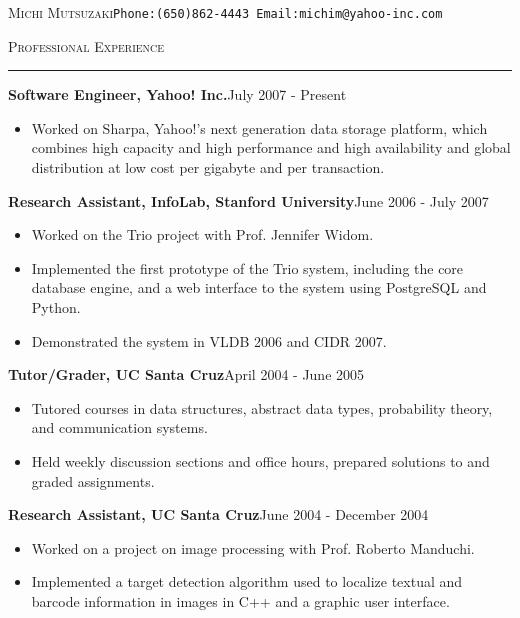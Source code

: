 \documentclass[10pt]{article}
\newcommand{\name}[1]{\begin{center}\Large{\textsc{#1}}\end{center}}
\newcommand{\HRule}{\noindent\rule{\linewidth}{0.1mm}}
\newcommand{\header}[1]{\vspace{0.4cm}\noindent\textsc{\large{#1}}\vspace{-0.2cm}\newline\HRule}
\newcommand{\subheader}[2]{\noindent \textbf{#1}\hspace{\stretch{1}}#2}
\renewcommand{\name}[2]{\noindent \textsc{\LARGE{#1}}\hspace{\stretch{1}}#2\vspace{-0.2cm}}
\begin{document}

\name{Michi Mutsuzaki}{\texttt{Phone:(650)862-4443 Email:michim@yahoo-inc.com}}


\header{Professional Experience}
\subheader{Software Engineer, Yahoo! Inc.}{July 2007 - Present}

\noindent
\begin{itemize}
\item Worked on Sharpa, Yahoo!'s next generation data storage platform, 
which combines high capacity and high performance and high 
availability and global distribution at low cost per gigabyte and per transaction. 
\end{itemize}
\vspace{0.2cm}

\subheader{Research Assistant, InfoLab, Stanford University}{June 2006 - July 2007}

\noindent
\begin{itemize}
\item Worked on the Trio project with Prof. Jennifer Widom.
\item Implemented the first prototype of the Trio system, including the
core database engine,  and a web interface to the system using PostgreSQL 
and Python.
\item Demonstrated the system in VLDB 2006 and CIDR 2007. 
\end{itemize}
\vspace{0.2cm}

\subheader{Tutor/Grader, UC Santa Cruz}{April 2004 - June 2005}

\noindent
\begin{itemize}
\item Tutored courses in data structures, abstract data types, probability
theory, and communication systems. 
\item Held weekly discussion sections and office hours, prepared solutions
to and graded assignments.
\end{itemize}
\vspace{0.2cm}

\subheader{Research Assistant, UC Santa Cruz}{June 2004 - December 2004}

\noindent
\begin{itemize}
\item Worked on a project on image processing with Prof. Roberto Manduchi. 
\item Implemented a target detection algorithm used to localize textual and barcode information in images 
in C++ and a graphic user interface.
\end{itemize}
\vspace{0.2cm}
\end{document}

